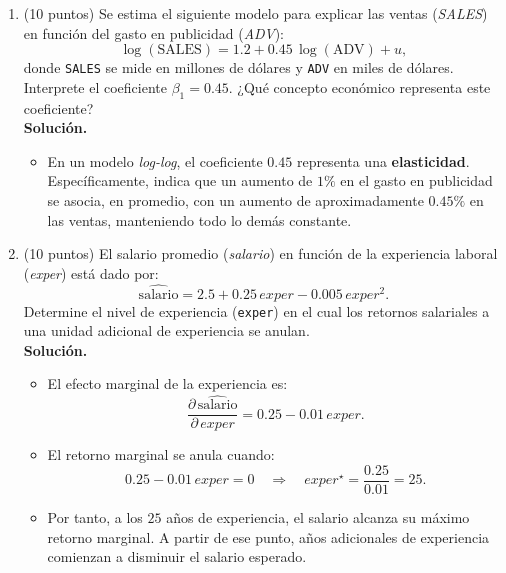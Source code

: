 \documentclass[10pt,a4paper]{article}
\begin{document}
\begin{enumerate}
    \item (10 puntos) Se estima el siguiente modelo para explicar las ventas (\emph{SALES})
        en función del gasto en publicidad (\emph{ADV}):
        \[
          \log(\text{SALES})
          = 1.2 + 0.45\,\log(\text{ADV}) + u ,
        \]
        donde \texttt{SALES} se mide en millones de dólares y \texttt{ADV}
        en miles de dólares. Interprete el coeficiente \(\beta_1 = 0.45\). ¿Qué concepto económico representa este coeficiente?\\

        \textbf{Solución.}
        \begin{itemize}
          \item En un modelo \emph{log-log}, el coeficiente \(0.45\)
                representa una \textbf{elasticidad}.
                Específicamente, indica que un aumento de \(1\%\) en el gasto
                en publicidad se asocia, en promedio, con un aumento de
                aproximadamente \(0.45\%\) en las ventas, manteniendo todo
                lo demás constante.
        \end{itemize}
        
\item (10 puntos) El salario promedio (\emph{salario}) en función de la experiencia laboral
        (\emph{exper}) está dado por:
        \[
          \widehat{\text{salario}}
          = 2.5 + 0.25\,exper - 0.005\,exper^2 .
        \]
        Determine el nivel de experiencia (\texttt{exper}) en el cual los
                retornos salariales a una unidad adicional de experiencia
                se anulan.
 \\
 \textbf{Solución.}
        \begin{itemize}
          \item El efecto marginal de la experiencia es:
                \[
                  \frac{\partial\,\widehat{\text{salario}}}{\partial\,exper}
                  = 0.25 - 0.01\,exper.
                \]
          \item El retorno marginal se anula cuando:
                \[
                  0.25 - 0.01\,exper = 0
                  \quad\Rightarrow\quad
                  exper^\star = \frac{0.25}{0.01} = 25.
                \]
          \item Por tanto, a los \(25\) años de experiencia,
                el salario alcanza su máximo retorno marginal.
                A partir de ese punto, años adicionales de experiencia
                comienzan a disminuir el salario esperado.
        \end{itemize}


\end{enumerate}
\end{document}

